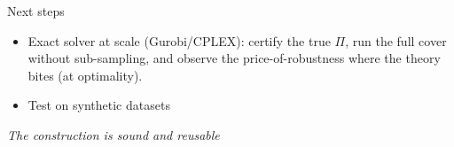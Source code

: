\documentclass[11pt,aspectratio=169]{beamer}
\begin{document}
\begin{frame}{Next steps}
  \begin{itemize}
    \item \alert{Exact solver at scale} (Gurobi/CPLEX): certify the true $\Pi$,
          run the full cover without sub-sampling, and observe the price-of-robustness
          where the theory bites (at optimality).
    \item Test on synthetic datasets
  \end{itemize}
  \vspace{0.6em}
  \begin{center}
    \emph{The construction is sound and reusable}
  \end{center}
\end{frame}

\end{document}

